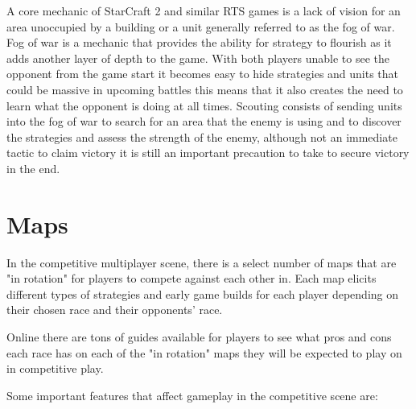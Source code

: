 \documentclass[a4paper,12pt]{report}
\begin{document}
A core mechanic of StarCraft 2 and similar RTS games is a lack of vision for an area unoccupied by a building or a unit generally referred to as the fog of war. Fog of war is a mechanic that provides the ability for strategy to flourish as it adds another layer of depth to the game. With both players unable to see the opponent from the game start it becomes easy to hide strategies and units that could be massive in upcoming battles this means that it also creates the need to learn what the opponent is doing at all times. Scouting consists of sending units into the fog of war to search for an area that the enemy is using and to discover the strategies and assess the strength of the enemy, although not an immediate tactic to claim victory it is still an important precaution to take to secure victory in the end.

\section{Maps}

In the competitive multiplayer scene, there is a select number of maps that are "in rotation" for players to compete against each other in. Each map elicits different types of strategies and early game builds for each player depending on their chosen race and their opponents’ race.

Online there are tons of guides available for players to see what pros and cons each race has on each of the "in rotation" maps they will be expected to play on in competitive play.

Some important features that affect gameplay in the competitive scene are:
\end{document}
